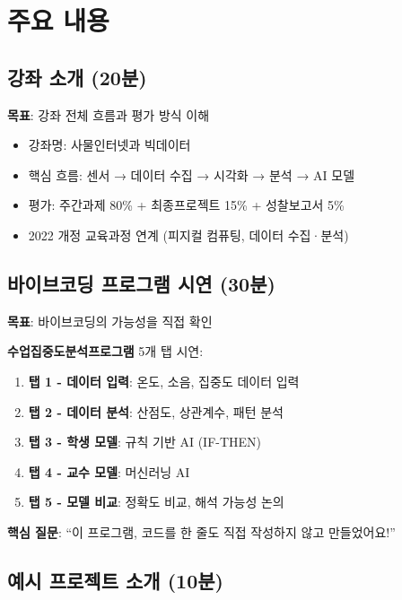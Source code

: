 \documentclass[11pt, a4paper]{article}
\begin{document}
\section{주요 내용}

\subsection{강좌 소개 (20분)}

\textbf{목표}: 강좌 전체 흐름과 평가 방식 이해

\begin{itemize}
    \item 강좌명: 사물인터넷과 빅데이터
    \item 핵심 흐름: 센서 → 데이터 수집 → 시각화 → 분석 → AI 모델
    \item 평가: 주간과제 80\% + 최종프로젝트 15\% + 성찰보고서 5\%
    \item 2022 개정 교육과정 연계 (피지컬 컴퓨팅, 데이터 수집·분석)
\end{itemize}

\subsection{바이브코딩 프로그램 시연 (30분)}

\textbf{목표}: 바이브코딩의 가능성을 직접 확인

\textbf{수업집중도분석프로그램} 5개 탭 시연:

\begin{enumerate}
    \item \textbf{탭 1 - 데이터 입력}: 온도, 소음, 집중도 데이터 입력
    \item \textbf{탭 2 - 데이터 분석}: 산점도, 상관계수, 패턴 분석
    \item \textbf{탭 3 - 학생 모델}: 규칙 기반 AI (IF-THEN)
    \item \textbf{탭 4 - 교수 모델}: 머신러닝 AI
    \item \textbf{탭 5 - 모델 비교}: 정확도 비교, 해석 가능성 논의
\end{enumerate}

\begin{info}
\textbf{핵심 질문}: ``이 프로그램, 코드를 한 줄도 직접 작성하지 않고 만들었어요!''
\end{info}

\subsection{예시 프로젝트 소개 (10분)}
\end{document}
